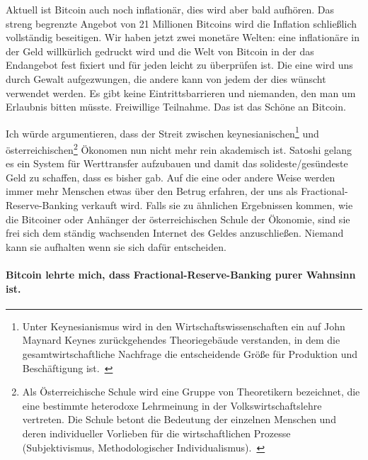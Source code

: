 Aktuell ist Bitcoin auch noch inflationär, dies wird aber bald aufhören. Das
streng begrenzte Angebot von 21 Millionen Bitcoins wird die Inflation
schließlich vollständig beseitigen. Wir haben jetzt zwei monetäre Welten: eine
inflationäre in der Geld willkürlich gedruckt wird und die Welt von Bitcoin in
der das Endangebot fest fixiert und für jeden leicht zu überprüfen ist. Die eine
wird uns durch Gewalt aufgezwungen, die andere kann von jedem der dies wünscht
verwendet werden. Es gibt keine Eintrittsbarrieren und niemanden, den man um
Erlaubnis bitten müsste. Freiwillige Teilnahme. Das ist das Schöne an Bitcoin.

Ich würde argumentieren, dass der Streit zwischen keynesianischen\footnote{Unter
Keynesianismus wird in den Wirtschaftswissenschaften ein auf John Maynard Keynes
zurückgehendes Theoriegebäude verstanden, in dem die gesamtwirtschaftliche
Nachfrage die entscheidende Größe für Produktion und Beschäftigung
ist.~\cite{wiki:keynesian}} und österreichischen\footnote{Als Österreichische
Schule wird eine Gruppe von Theoretikern bezeichnet, die eine bestimmte
heterodoxe Lehrmeinung in der Volkswirtschaftslehre vertreten. Die Schule betont
die Bedeutung der einzelnen Menschen und deren individueller Vorlieben für die
wirtschaftlichen Prozesse (Subjektivismus, Methodologischer
Individualismus).~\cite{wiki:austrian}} Ökonomen nun nicht mehr rein akademisch
ist. Satoshi gelang es ein System für Werttransfer aufzubauen und
damit das solideste/gesündeste Geld zu schaffen, dass es bisher gab. Auf die
eine oder andere Weise werden immer mehr Menschen etwas über den Betrug
erfahren, der uns als Fractional-Reserve-Banking verkauft wird. Falls sie zu
ähnlichen Ergebnissen kommen, wie die Bitcoiner oder Anhänger der
österreichischen Schule der Ökonomie, sind sie frei sich dem ständig wachsenden
Internet des Geldes anzuschließen. Niemand kann sie aufhalten wenn sie sich
dafür entscheiden.

\paragraph{Bitcoin lehrte mich, dass Fractional-Reserve-Banking purer Wahnsinn ist.}

%
%
%
%
%

